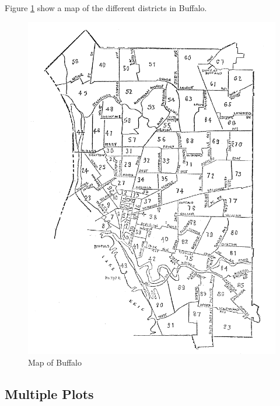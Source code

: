\documentclass{article}
\begin{document}
Figure \ref{fig:buffalo} show a map of the different districts in Buffalo.
\begin{figure}[h]
    \centering
    \includegraphics[scale=0.6]{../img/BuffaloMap}
    \caption{Map of Buffalo}
    \label{fig:buffalo}
\end{figure}

\subsection{Multiple Plots}\label{subsec:multiplot}
\end{document}
